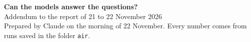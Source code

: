 \documentclass[10pt,letterpaper]{article}
\newcommand{\s}[1]{\texttt{#1}}          %
\begin{document}
\begin{center}
{\LARGE\bfseries Can the models answer the questions?}\\[5pt]
{\large Addendum to the report of 21 to 22 November 2026}\\[3pt]
{\small\color{soft} Prepared by Claude on the morning of 22 November. Every number comes from runs saved in the folder \s{air}.}
\end{center}


\end{document}
